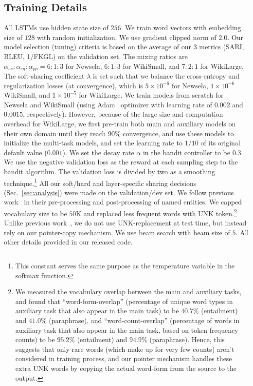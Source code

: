 \documentclass[11pt]{article}
\def\secref#1{Sec.~\ref{#1}}
\begin{document}
\subsection{Training Details}
All LSTMs use hidden state size of $256$. We train word vectors with embedding size of $128$ with random initialization. 
We use gradient clipped norm of $2.0$. Our model selection (tuning) criteria is based on the average of our 3 metrics (SARI, BLEU, 1/FKGL) on the validation set. The mixing ratios are $\alpha_{ss}{:}\alpha_{eg}{:}\alpha_{pp} = 6{:}1{:}3$ for Newsela, $6{:}1{:}3$ for WikiSmall, and $7{:}2{:}1$ for WikiLarge. The soft-sharing coefficient $\lambda$ is set such that we balance the cross-entropy and regularization losses (at convergence),
which is $5 \times 10^{-6}$ for Newsela, $1 \times 10^{-6}$ WikiSmall, and $1 \times 10^{-5}$ for WikiLarge. We train models from scratch for Newsela and WikiSmall (using Adam~\cite{Kingma2014AdamAM} optimizer with learning rate of $0.002$ and $0.0015$, respectively). However, because of the large size and computation overhead for WikiLarge, we first pre-train both main and auxiliary models on their own domain until they reach $90\%$ convergence, and use these models to initialize the multi-task models, and set the learning rate to $1/10$ of its original default value ($0.001$). We set the decay rate $\alpha$ in the bandit controller to be $0.3$. We use the  negative validation loss as the reward at each sampling step to the bandit algorithm. The validation loss is divided by two as a smoothing technique.\footnote{This constant serves the same purpose as the temperature variable in the softmax function.} All our soft/hard and layer-specific sharing decisions (\secref{sec:analysis}) were made on the validation/dev set.
We follow previous work~\cite{zhang2017dress} in their pre-processing and post-processing of named entities.
We capped vocabulary size to be $50\textrm{K}$ and replaced less frequent words with $\textrm{UNK}$ token.\footnote{We measured the vocabulary overlap between the main and auxiliary tasks, and found that ``word-form-overlap'' (percentage of unique word types in auxiliary task that also appear in the main task) to be $40.7\%$ (entailment) and $41.0\%$ (paraphrase), and ``word-count-overlap'' (percentage of words in auxiliary task that also appear in the main task, based on token frequency counts) to be $95.2\%$ (entailment) and $94.9\%$ (paraphrase). Hence, this suggests that only rare words (which make up for very few counts) aren't considered in training process, and our pointer mechanism handles these extra UNK words by copying the actual word-form from the source to the output.} Unlike previous work~\cite{zhang2017dress}, we do not use $\textrm{UNK}$-replacement at test time, but instead rely on our pointer-copy mechanism. We use beam search with beam size of $5$. All other details provided in our released code. 
\end{document}

